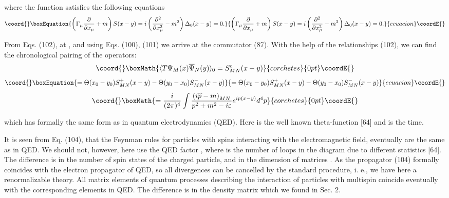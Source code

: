 \documentclass[a4paper,12pt]{article}
\begin{document}
where the function \coordHE{} satisfies the following equations
\begin{equation}\coord{}\boxEquation{
\left( \Gamma _\mu \frac \partial {\partial x_\mu }+m\right)
S(x-y)=i\left( \frac{\partial ^2}{\partial x_\mu ^2}-m^2\right)
\Delta _0(x-y)=0 .\label{103}
}{
\left( \Gamma _\mu \frac \partial {\partial x_\mu }+m\right)
S(x-y)=i\left( \frac{\partial ^2}{\partial x_\mu ^2}-m^2\right)
\Delta _0(x-y)=0 .}{ecuacion}\coordE{}\end{equation}

From Eqs. (102), at \coordHE{}, and using Eqs. (100), (101) we arrive
at the commutator (87). With the help of the relationships (102), we can
find the chronological pairing of the operators:
\[\coord{}\boxMath{
\langle T\Psi _M(x)\overline{\Psi }_N(y)\rangle _0=S_{MN}^c(x-y)
}{corchetes}{0pt}\coordE{}\]
\begin{equation}\coord{}\boxEquation{
=\Theta (x_0-y_0)S_{MN}^{+}(x-y)-\Theta (y_0-x_0)S_{MN}^{-}(x-y)  \label{104}
}{
=\Theta (x_0-y_0)S_{MN}^{+}(x-y)-\Theta (y_0-x_0)S_{MN}^{-}(x-y)  }{ecuacion}\coordE{}\end{equation}
\[\coord{}\boxMath{
=\frac i{(2\pi )^4}\int \frac{\left( i\widehat{p}-m\right) _{MN}}{
p^2+m^2-i\varepsilon }e^{ip(x-y)}d^4p
}{corchetes}{0pt}\coordE{}\]

which has formally the same form as in quantum electrodynamics
(QED). Here \coordHE{} is the well known theta-function [64]
and \coordHE{} is the time.

It is seen from Eq. (104), that the Feynman rules for particles
with spins \coordHE{} interacting with the electromagnetic field,
eventually are the same as in QED. We should not, however, here
use the QED factor \coordHE{}, where \coordHE{} is the number of
loops in the diagram due to different statistics [64]. The
difference is in the number of spin states of the charged
particle, and in the dimension of matrices \myHighlight{$\Gamma _\mu $}\coordHE{}. As the
propagator (104) formally coincides with the electron propagator
of QED, so all divergences can be cancelled by the standard
procedure, i. e., we have here a renormalizable theory. All matrix
elements of quantum processes describing the interaction of
particles with multispin \coordHE{} coincide eventually with the
corresponding elements in QED. The difference is in the density
matrix \myHighlight{$ \Psi \cdot \overline{\Psi }$}\coordHE{} which we found in Sec. 2.
\end{document}
